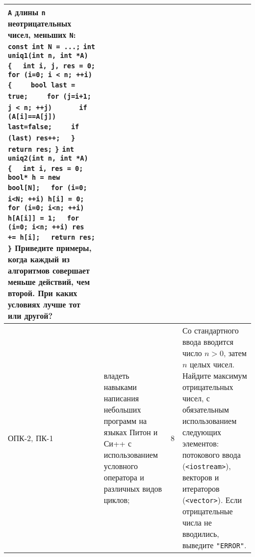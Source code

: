 \documentclass[a4paper,12pt]{article}
\begin{document}
\begin{longtable}{|p{15mm}|p{42mm}|p{17mm}|p{70mm}|}
{\tt A} длины {\tt n} неотрицательных чисел, меньших {\tt N}:\newline
\verb!const int N = ...;!\newline
\verb!int uniq1(int n, int *A) {!\newline
\verb!  int i, j, res = 0;!\newline
\verb!  for (i=0; i < n; ++i){!\newline
\verb!    bool last = true;!\newline
\verb!    for (j=i+1; j < n; ++j)!\newline
\verb!      if (A[i]==A[j]) last=false;!\newline
\verb!    if (last) res++;!\newline
\verb!  }!\newline
\verb!  return res;!\newline
\verb!}!\newline
\verb!int uniq2(int n, int *A) {!\newline
\verb!  int i, res = 0;!\newline
\verb!  bool* h = new bool[N];!\newline
\verb!  for (i=0; i<N; ++i) h[i] = 0;!\newline
\verb!  for (i=0; i<n; ++i) h[A[i]] = 1;!\newline
\verb!  for (i=0; i<n; ++i) res += h[i];!\newline
\verb!  return res;!\newline
\verb!}!\newline
Приведите примеры, когда каждый из алгоритмов совершает меньше действий, чем второй. При каких условиях лучше тот или другой? 
\\
\hline
ОПК-2, ПК-1 & 
владеть навыками написания небольших программ на языках Питон и Си++ с использованием условного оператора и различных видов циклов; & 
8 & 
Со стандартного ввода вводится число $n>0$, затем $n$ целых чисел.
Найдите максимум отрицательных чисел, с обязательным использованием
следующих элементов: потокового ввода (\texttt{<iostream>}), векторов и итераторов (\texttt{<vector>}).
Если отрицательные числа не вводились, выведите \texttt{"ERROR"}. 
\\
\hline
\end{longtable}
\end{document}
